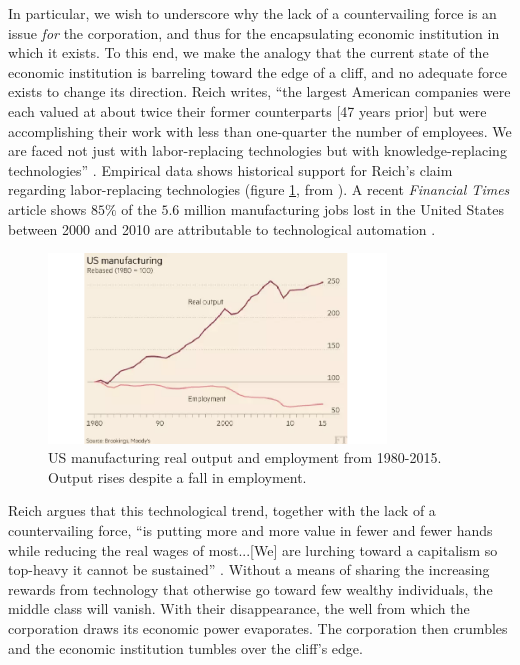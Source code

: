 \documentclass[12pt]{article}
\begin{document}
In particular, we wish to underscore why the lack of a countervailing force is an issue \textit{for} the corporation, and thus for the encapsulating economic institution in which it exists. To this end, we make the analogy that the current state of the economic institution is barreling toward the edge of a cliff, and no adequate force exists to change its direction. Reich writes, ``the largest American companies were each valued at about twice their former counterparts [47 years prior] but were accomplishing their work with less than one-quarter the number of employees. We are faced not just with labor-replacing technologies but with knowledge-replacing technologies'' \cite[Reich 207]{Reich}. Empirical data shows historical support for Reich's claim regarding labor-replacing technologies (figure \ref{fig:manufacturing}, from \cite[Coco]{Coco}). A recent \textit{Financial Times} article shows $85\%$ of the $5.6$ million manufacturing jobs lost in the United States between 2000 and 2010 are attributable to technological automation \cite[Coco]{Coco}. 
\begin{figure}[!htbp]
\begin{center}
\includegraphics[width=0.80\textwidth]
{us_manuf.png}
\captionsetup{justification=centering}
\caption{US manufacturing real output and employment from 1980-2015. \\ Output rises despite a fall in employment.}
\label{fig:manufacturing}
\end{center}
\end{figure}

Reich argues that this technological trend, together with the lack of a countervailing force, ``is putting more and more value in fewer and fewer hands while reducing the real wages of most...[We] are lurching toward a capitalism so top-heavy it cannot be sustained'' \cite[Reich 214]{Reich}. Without a means of sharing the increasing rewards from technology that otherwise go toward few wealthy individuals, the middle class will vanish. With their disappearance, the well from which the corporation draws its economic power evaporates. The corporation then crumbles and the economic institution tumbles over the cliff's edge. 
\end{document}
